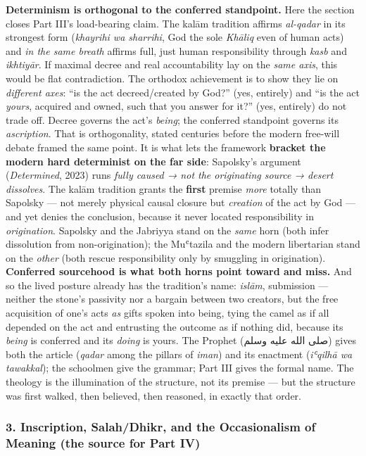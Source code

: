 \documentclass[11pt]{article}
\newcommand{\AR}[1]{{\arabicfont\beginR #1\endR}}
\begin{document}
\textbf{Determinism is orthogonal to the conferred standpoint.} Here the section closes Part III's load-bearing claim. The kalām tradition affirms \emph{al-qadar} in its strongest form (\emph{khayrihi wa sharrihi}, God the sole \emph{Khāliq} even of human acts) and \emph{in the same breath} affirms full, just human responsibility through \emph{kasb} and \emph{ikhtiyār}. If maximal decree and real accountability lay on the \emph{same axis}, this would be flat contradiction. The orthodox achievement is to show they lie on \emph{different axes}: ``is the act decreed/\allowbreak{}created by God?'' (yes, entirely) and ``is the act \emph{yours}, acquired and owned, such that you answer for it?'' (yes, entirely) do not trade off. Decree governs the act's \emph{being}; the conferred standpoint governs its \emph{ascription}. That is orthogonality, stated centuries before the modern free-will debate framed the same point. It is what lets the framework \textbf{bracket the modern hard determinist on the far side}: Sapolsky's argument (\emph{Determined}, 2023) runs \emph{fully caused → not the originating source → desert dissolves}. The kalām tradition grants the \textbf{first} premise \emph{more} totally than Sapolsky — not merely physical causal closure but \emph{creation} of the act by God — and yet denies the conclusion, because it never located responsibility in \emph{origination}. Sapolsky and the Jabriyya stand on the \emph{same} horn (both infer dissolution from non-origination); the Muʿtazila and the modern libertarian stand on the \emph{other} (both rescue responsibility only by smuggling in origination). \textbf{Conferred sourcehood is what both horns point toward and miss.} And so the lived posture already has the tradition's name: \emph{islām}, submission — neither the stone's passivity nor a bargain between two creators, but the free acquisition of one's acts \emph{as} gifts spoken into being, tying the camel as if all depended on the act and entrusting the outcome as if nothing did, because its \emph{being} is conferred and its \emph{doing} is yours. The Prophet (\AR{صلى الله عليه وسلم}) gives both the article (\emph{qadar} among the pillars of \emph{iman}) and its enactment (\emph{iʿqilhā wa tawakkal}); the schoolmen give the grammar; Part III gives the formal name. The theology is the illumination of the structure, not its premise — but the structure was first walked, then believed, then reasoned, in exactly that order.

\subsubsection*{3. Inscription, Salah/\allowbreak{}Dhikr, and the Occasionalism of Meaning (the source for Part IV)}
\end{document}
